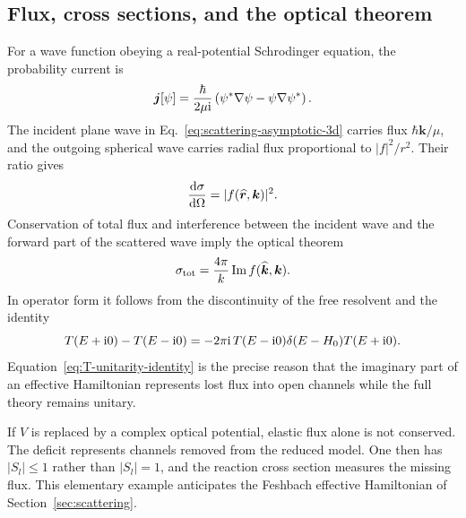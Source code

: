 \subsection{Flux, cross sections, and the optical theorem}
\label{subsec:flux-cross-sections}

For a wave function obeying a real-potential Schrodinger equation, the
probability current is
\begin{equation}
  \bm j[\psi]
  =\frac{\hbar}{2\mu\mathrm{i}}
  \left(\psi^*\nabla\psi-\psi\nabla\psi^*\right) .
  \label{eq:probability-current-3d}
\end{equation}
The incident plane wave in Eq.~\eqref{eq:scattering-asymptotic-3d} carries
flux $\hbar\bm k/\mu$, and the outgoing spherical wave carries radial flux
proportional to $\lvert f\rvert^2/r^2$.  Their ratio gives
\begin{equation}
  \frac{\mathrm{d}\sigma}{\mathrm{d}\Omega}
  =\lvert f(\widehat{\bm r},\bm k)\rvert^2 .
  \label{eq:differential-cross-section}
\end{equation}
Conservation of total flux and interference between the incident wave and the
forward part of the scattered wave imply the optical theorem
\begin{equation}
  \sigma_{\mathrm{tot}}
  =\frac{4\pi}{k}\operatorname{Im} f(\widehat{\bm k},\bm k) .
  \label{eq:optical-theorem}
\end{equation}
In operator form it follows from the discontinuity of the free resolvent and
the identity
\begin{equation}
  T(E+\mathrm{i}0)-T(E-\mathrm{i}0)
  =-2\pi\mathrm{i}\,T(E-\mathrm{i}0)\delta(E-H_0)T(E+\mathrm{i}0) .
  \label{eq:T-unitarity-identity}
\end{equation}
Equation~\eqref{eq:T-unitarity-identity} is the precise reason that the
imaginary part of an effective Hamiltonian represents lost flux into open
channels while the full theory remains unitary.

If $V$ is replaced by a complex optical potential, elastic flux alone is not
conserved.  The deficit represents channels removed from the reduced model.
One then has $\lvert S_l\rvert\leq1$ rather than
$\lvert S_l\rvert=1$, and the reaction cross section measures the missing
flux.  This elementary example anticipates the Feshbach effective
Hamiltonian of Section~\ref{sec:scattering}.

